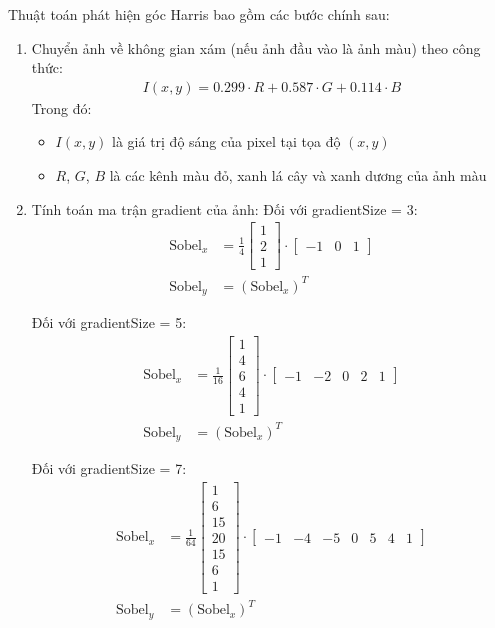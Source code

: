 \documentclass[12pt]{article}
\begin{document}
Thuật toán phát hiện góc Harris \cite{nvidia_harris} bao gồm các bước chính sau:
\begin{enumerate}
    \item Chuyển ảnh về không gian xám (nếu ảnh đầu vào là ảnh màu) theo công thức:
        \begin{align}
        I(x,y) = 0.299 \cdot R + 0.587 \cdot G + 0.114 \cdot B
        \end{align}
        Trong đó:
        \begin{itemize}
            \item $I(x,y)$ là giá trị độ sáng của pixel tại tọa độ $(x,y)$
            \item $R$, $G$, $B$ là các kênh màu đỏ, xanh lá cây và xanh dương của ảnh màu
        \end{itemize}
    \item Tính toán ma trận gradient của ảnh:
        \subitem Đối với gradientSize = 3:
            \begin{align}
            \text{Sobel}_x &= \frac{1}{4} \begin{bmatrix} 1 \\ 2 \\ 1 \end{bmatrix} \cdot \begin{bmatrix} -1 & 0 & 1 \end{bmatrix}\\
            \text{Sobel}_y &= (\text{Sobel}_x)^T
            \end{align}

        \subitem Đối với gradientSize = 5:
            \begin{align}
            \text{Sobel}_x &= \frac{1}{16} \begin{bmatrix} 1 \\ 4 \\ 6 \\ 4 \\ 1 \end{bmatrix} \cdot \begin{bmatrix} -1 & -2 & 0 & 2 & 1 \end{bmatrix} \\
            \text{Sobel}_y &= (\text{Sobel}_x)^T
            \end{align}
            
        \subitem Đối với gradientSize = 7:
            \begin{align}
            \text{Sobel}_x &= \frac{1}{64} \begin{bmatrix} 1 \\ 6 \\ 15 \\ 20 \\ 15 \\ 6 \\ 1 \end{bmatrix} \cdot \begin{bmatrix} -1 & -4 & -5 & 0 & 5 & 4 & 1 \end{bmatrix} \\
            \text{Sobel}_y &= (\text{Sobel}_x)^T
            \end{align}


\end{enumerate}
\end{document}
